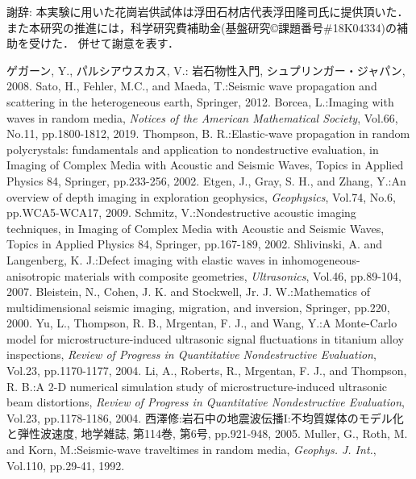 \documentclass{jsce}
\begin{document}
{\gt 謝辞:}
本実験に用いた花崗岩供試体は浮田石材店代表浮田隆司氏に提供頂いた．
また本研究の推進には，科学研究費補助金(基盤研究©課題番号\#18K04334)の補助を受けた．
併せて謝意を表す．
\begin{thebibliography}{99}
\begin{spacing}{1.175}
	ゲガーン, Y., パルシアウスカス, V.: 
	岩石物性入門, シュプリンガー・ジャパン, 2008. 
	Sato, H., Fehler, M.C., and Maeda, T.:Seismic wave propagation and scattering in the heterogeneous earth, 
	Springer, 2012.
	Borcea, L.:Imaging with waves in random media, {\it Notices of the American Mathematical Society}, Vol.66, No.11, 
	pp.1800-1812, 2019.
	Thompson, B. R.:Elastic-wave propagation in random polycrystals: 
	fundamentals and application to nondestructive evaluation, 
	in Imaging of Complex Media with Acoustic and Seismic Waves, Topics in Applied Physics 84, Springer, pp.233-256, 2002.
	Etgen, J., Gray, S. H., and Zhang, Y.:An overview of depth imaging in exploration geophysics, 
	{\it Geophysics}, Vol.74, No.6, pp.WCA5-WCA17, 2009.
	Schmitz, V.:Nondestructive acoustic imaging techniques, in Imaging of Complex Media with Acoustic and Seismic Waves, 
	Topics in Applied Physics 84, Springer, pp.167-189, 2002.
	Shlivinski, A. and Langenberg, K. J.:Defect imaging with elastic waves in inhomogeneous-anisotropic materials with composite geometries, {\it Ultrasonics}, Vol.46, pp.89-104, 2007.
	Bleistein, N., Cohen, J. K. and Stockwell, Jr. J. W.:Mathematics of multidimensional seismic imaging, migration, and inversion, Springer, pp.220, 2000.
	Yu, L., Thompson, R. B., Mrgentan, F. J., and Wang, Y.:A Monte-Carlo model for microstructure-induced ultrasonic signal fluctuations in titanium alloy inspections,
	{\it Review of Progress in Quantitative Nondestructive Evaluation}, Vol.23, pp.1170-1177, 2004.
	Li, A., Roberts, R., Mrgentan, F. J., and Thompson, R. B.:A 2-D numerical simulation study of microstructure-induced  ultrasonic beam distortions,
	{\it Review of Progress in Quantitative Nondestructive Evaluation}, Vol.23, pp.1178-1186, 2004.
	西澤修:岩石中の地震波伝播I:不均質媒体のモデル化と弾性波速度, 地学雑誌, 第114巻, 第6号,  pp.921-948,  2005.
	Muller, G., Roth, M. and Korn, M.:Seismic-wave traveltimes in random media,
	{\it Geophys. J. Int.}, Vol.110, pp.29-41, 1992. 

\end{spacing}
\end{thebibliography}
\end{document}
